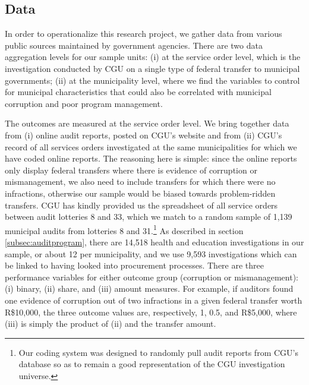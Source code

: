\documentclass[11pt]{article}
\begin{document}
\subsection{Data} \label{subsec:data}

In order to operationalize this research project, we gather data from various public sources maintained by government agencies. There are two data aggregation levels for our sample units: (i) at the service order level, which is the investigation conducted by CGU on a single type of federal transfer to municipal governments; (ii) at the municipality level, where we find the variables to control for municipal characteristics that could also be correlated with municipal corruption and poor program management.

The outcomes are measured at the service order level. We bring together data from (i) online audit reports, posted on CGU's website and from (ii) CGU's record of all services orders investigated at the same municipalities for which we have coded online reports. The reasoning here is simple: since the online reports only display federal transfers where there is evidence of corruption or mismanagement, we also need to include transfers for which there were no infractions, otherwise our sample would be biased towards problem-ridden transfers. CGU has kindly provided us the spreadsheet of all service orders between audit lotteries 8 and 33, which we match to a random sample of 1,139 municipal audits from lotteries 8 and 31.\footnote{Our coding system was designed to randomly pull audit reports from CGU's database so as to remain a good representation of the CGU investigation universe.} As described in section \ref{subsec:auditprogram}, there are 14,518 health and education investigations in our sample, or about 12 per municipality, and we use 9,593 investigations which can be linked to having looked into procurement processes. There are three performance variables for either outcome group (corruption or mismanagement): (i) binary, (ii) share, and (iii) amount measures. For example, if auditors found one evidence of corruption out of two infractions in a given federal transfer worth R\$10,000, the three outcome values are, respectively, 1, 0.5, and R\$5,000, where (iii) is simply the product of (ii) and the transfer amount.
\end{document}
